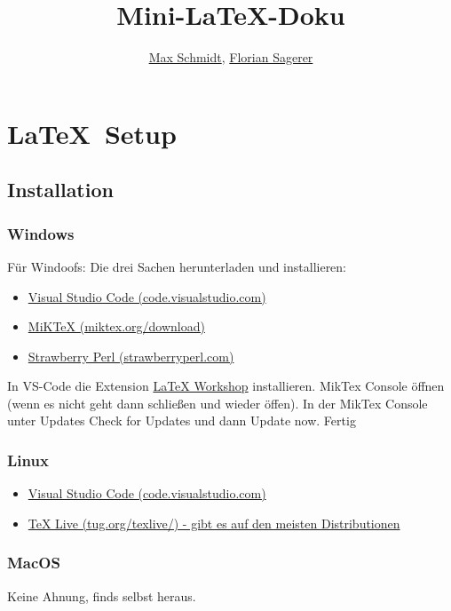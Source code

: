 \documentclass{article}
\begin{document}
\title{Mini-\LaTeX-Doku}
\author{\href{mailto:to.maxschmidt@pm.me}{Max Schmidt}, \href{mailto:f.sagerer@protonmail.com}{Florian Sagerer}}

\maketitle
\thispagestyle{empty}

\tableofcontents
\thispagestyle{empty}
\newpage

\section{\LaTeX\ Setup}
\subsection{Installation}
\subsubsection{Windows}
Für Windoofs: Die drei Sachen herunterladen und installieren: 
\begin{itemize}
    \item \href{https://code.visualstudio.com/}{Visual Studio Code (code.visualstudio.com)}
    \item \href{https://miktex.org/download}{MiKTeX (miktex.org/download)}
    \item \href{https://strawberryperl.com/}{Strawberry Perl (strawberryperl.com)}
\end{itemize}
In VS-Code die Extension \href{https://open-vsx.org/extension/James-Yu/latex-workshop}{LaTeX Workshop} installieren. MikTex Console öffnen (wenn es nicht geht dann schließen und wieder öffen).
In der MikTex Console unter Updates Check for Updates und dann Update now. Fertig 
\subsubsection{Linux}
\begin{itemize}
    \item \href{https://code.visualstudio.com/}{Visual Studio Code (code.visualstudio.com)}
    \item \href{https://tug.org/texlive/}{TeX Live (tug.org/texlive/) - gibt es auf den meisten Distributionen}
\end{itemize}

\subsubsection{MacOS}
Keine Ahnung, finds selbst heraus.
\end{document}
